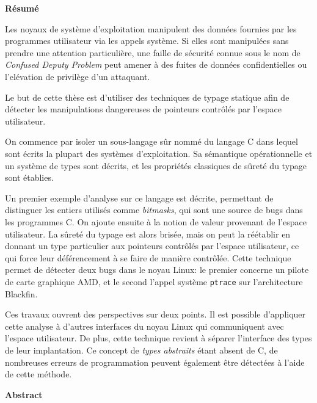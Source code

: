 \cleartoverso{}

\begin{headingpage}
\thispagestyle{empty}

\begin{center}\Large \textbf{Résumé}\end{center}

Les noyaux de système d'exploitation manipulent des données fournies par les
programmes utilisateur via les appels système. Si elles sont manipulées sans
prendre une attention particulière, une faille de sécurité connue sous le nom de
\emph{Confused Deputy Problem} peut amener à des fuites de données
confidentielles ou l'elévation de privilège d'un attaquant.

Le but de cette thèse est d'utiliser des techniques de typage statique afin de
détecter les manipulations dangereuses de pointeurs contrôlés par l'espace
utilisateur.

On commence par isoler un sous-langage sûr nommé \langname{} du langage C dans
lequel sont écrits la plupart des systèmes d'exploitation. Sa sémantique
opérationnelle et un système de types sont décrits, et les propriétés classiques
de sûreté du typage sont établies.

Un premier exemple d'analyse sur ce langage est décrite, permettant de
distinguer les entiers utilisés comme \emph{bitmasks}, qui sont une source de
bugs dans les programmes C. On ajoute ensuite à \langname{} la notion de valeur
provenant de l'espace utilisateur. La sûreté du typage est alors brisée, mais on
peut la réétablir en donnant un type particulier aux pointeurs contrôlés par
l'espace utilisateur, ce qui force leur déférencement à se faire de manière
contrôlée. Cette technique permet de détecter deux bugs dans le noyau Linux: le
premier concerne un pilote de carte graphique AMD, et le second l'appel système
\texttt{ptrace} sur l'architecture Blackfin.

Ces travaux ouvrent des perspectives sur deux points. Il est possible
d'appliquer cette analyse à d'autres interfaces du noyau Linux qui communiquent
avec l'espace utilisateur. De plus, cette technique revient à séparer
l'interface des types de leur implantation. Ce concept de \emph{types abstraits}
étant absent de C, de nombreuses erreurs de programmation peuvent également être
détectées à l'aide de cette méthode.

\begin{center}\Large \textbf{Abstract}\end{center}


\end{headingpage}
